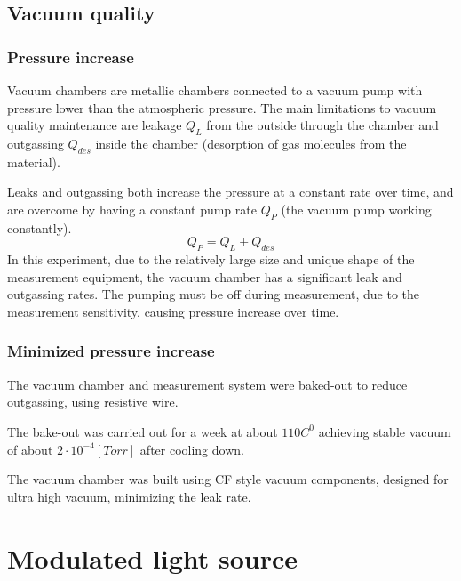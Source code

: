 \documentclass[\main/master.tex]{subfiles}
\begin{document}
\subsection{Vacuum quality}
\subsubsection{Pressure increase}
\par\noindent
Vacuum chambers are metallic chambers connected to a vacuum pump with pressure lower than the atmospheric pressure. The main limitations to vacuum quality maintenance are leakage $Q_L$ from the outside through the chamber and outgassing $Q_{des}$ inside the chamber (desorption of gas molecules from the material).
\par\noindent
Leaks and outgassing both increase the pressure at a constant rate over time, and are overcome by having a constant pump rate $Q_P$ (the vacuum pump working constantly).   
\begin{equation}
Q_P = Q_L + Q_{des}  \label{eqn:vacuum_equilibrium}
\end{equation}
In this experiment, due to the relatively large size and unique shape of the measurement equipment, the vacuum chamber has a significant leak and outgassing rates. The pumping must be off during measurement, due to the measurement sensitivity, causing pressure increase over time.
\subsubsection{Minimized pressure increase}
\par\noindent
The vacuum chamber and measurement system were baked-out to reduce outgassing, using resistive wire. 
\par\noindent
The bake-out was carried out for a week at about $110 C^0$ achieving stable vacuum of about $2\cdot 10^{−4} [Torr]$ after cooling down.
\par\noindent
The vacuum chamber was built using CF style vacuum components, designed for ultra high vacuum, minimizing the leak rate.
\section{Modulated light source}
\end{document}
